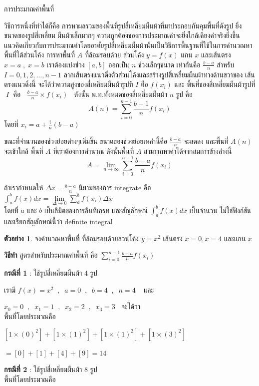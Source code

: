 \documentclass[
]{book}
\theoremstyle{definition}
\theoremstyle{definition}
\newtheorem{example}{ตัวอย่าง}[chapter]
\theoremstyle{definition}
\theoremstyle{definition}
\theoremstyle{remark}
\begin{document}
การประมาณค่าพื้นที่

วิธีการหนึ่งที่ทำได้ก็คือ การหาผลรวมของพื้นที่รูปสี่เหลี่ยมผืนผ้าที่มาประกอบกันคุมพื้นที่ดังรูป
ยิ่งขนาดของรูปสี่เหลี่ยม ผืนผ้าเล็กมากๆ
ความถูกต้องของการประมาณค่าจะยิ่งใกล้เคียงค่าจริงยิ่งขึ้น
แนวคิดเกี่ยวกับการประมาณค่าโดยอาศัยรูปสี่เหลี่ยมผืนผ้านั้นเป็นวิธีการพื้นฐานที่ใช้ในการคำนวณหาพื้นที่ใต้ส่วนโค้ง
การหาพื้นที่ \(A\) ที่ล้อมรอบด้วย ส่วนโค้ง \(y=f(x)\) แกน \(x\) และเส้นตรง \(x=a\;,\;x=b\)
เราต้องแบ่งช่วง \([a,b]\) ออกเป็น \(n\) ช่วงเล็กๆขนาด เท่ากันคือ \(\frac{b-a}{n}\)
สำหรับ \(I=0,1,2,…,n-1\)
ลากเส้นตรงแนวดิ่งตัวส่วนโค้งและสร้างรูปสี่เหลี่ยมผืนผ้าทางด้านขวาของ เส้นตรงแนวดิ่งนี้
จะได้ว่าความสูงของสี่เหลี่ยมผืนผ้ารูปที่ \(I\) คือ \(f(x_i)\) และ พื้นที่ของสี่เหลี่ยมผืนผ้ารูปที่
\(\;I\;\) คือ \(\;\;\frac{b-a}{n}\times f(x_i)\;\;\) ดังนั้น
พ.ท.ทั้งหมดของสี่เหลี่ยมผืนผ้า \(n\) รูป คือ
\[A(n)= \sum_{i=0}^{n-1}\frac{b-1}{n}f(x_i)\] โดยที่
\(x_i = a + \frac{i}{n}(b-a)\)

ขณะที่จำนวนของช่วงย่อยต่างๆเพิ่มขึ้น ขนาดของช่วงย่อยเหล่านี้คือ \(\frac{b-a}{n}\) จะลดลง
และพื้นที่ \(A(n)\) จะเข้าใกล้ พื้นที่ \(A\) ที่เราต้องการคำนวณ ดังนั้นพื้นที่ \(A\)
สามารถหาค่าได้จากสมการข้างล่างนี้
\[A= \lim\limits_{n\rightarrow\infty}\sum_{i=0}^{n-1}\frac{b-a}{n}f(x_i)\]

ถ้าเรากำหนดให้ \(\Delta x=\frac{b-a}{n}\) นิยามของการ integrate คือ
\(\int^b_af(x)dx=
\lim\limits_{\Delta\rightarrow 0}\sum_a^bf(x_i)\Delta x\)\\
โดยที่ \(a\) และ \(b\) เป็นลิมิตของการอินทิเกรท และสัญลักษณ์ \(\int^b_af(x)dx\) เป็นจำนวน
ไม่ใช่ฟังก์ชัน และเรียกสัญลักษณ์นี้ว่า definite integral

\begin{example}
จงคำนวณหาพื้นที่ ที่ล้อมรอบด้วยส่วนโค้ง \(y=x^2\) เส้นตรง \(x=0,x=4\) และแกน \(x\)
\end{example}

\textbf{วิธีทำ} สูตรสำหรับประมาณค่าพื้นที่ คือ \(\sum_{i=0}^{n-1}\frac{b-a}{n}f(x_i)\)

\textbf{กรณีที่ 1} : ใช้รูปสี่เหลี่ยมผืนผ้า 4 รูป

เรามี \(f(x)=x^2\;\;,\;\;a=0\;\;,\;\;b=4\;\;,\;\;n=4\;\;\;\) และ

\(x_0=0\;\;,\;\;x_1=1\;\;,\;\;x_2=2\;\;,\;\;x_3=3\;\;\) จะได้ว่า\\
พื้นที่โดยประมาณคือ

\([1\times (0)^2]+[1\times (1)^2]+[1\times (1)^2]+ [1\times (3)^2]\)

\(=[0]+[1]+[4]+[9]=14\)

\textbf{กรณีที่ 2} : ใช้รูปสี่เหลี่ยมผืนผ้า 8 รูป\\
พื้นที่โดยประมาณคือ
\end{document}
